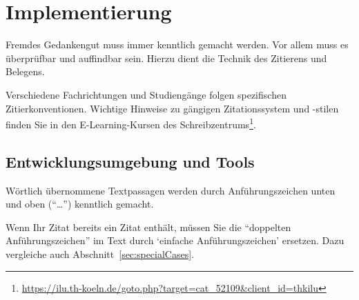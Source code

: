 \chapter{Implementierung}
\label{chap:literature}
%
Fremdes Gedankengut muss immer kenntlich gemacht werden. Vor allem muss es überprüfbar und auffindbar sein. Hierzu dient die Technik des Zitierens und Belegens.
\par
Verschiedene Fachrichtungen und Studiengänge folgen spezifischen Zitierkonventionen. Wichtige Hinweise zu gängigen Zitationssystem und -stilen finden Sie in den E-Learning-Kursen des Schreibzentrums\footnote{\href{https://ilu.th-koeln.de/goto.php?target=cat\_52109\&client\_id=thkilu}{https://ilu.th-koeln.de/goto.php?target=cat\_52109\&client\_id=thkilu}}.
%
\section{Entwicklungsumgebung und Tools}
\par
Wörtlich übernommene Textpassagen werden durch Anführungszeichen unten und oben (\enquote{\ldots}) kenntlich gemacht.
\par
Wenn Ihr Zitat bereits ein Zitat enthält, müssen Sie die \enquote{doppelten Anführungszeichen} im Text durch \enquote*{einfache Anführungszeichen} ersetzen. Dazu vergleiche auch Abschnitt~\ref{sec:specialCases}.
%
